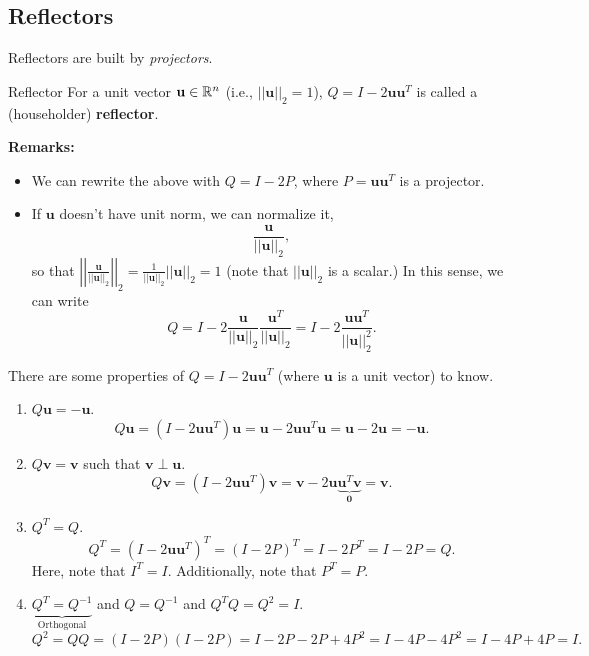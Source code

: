 \documentclass[letterpaper]{article}
\newcommand{\0}{\mathbf{0}}
\newcommand{\vv}{\mathbf{v}}
\renewcommand{\u}{\mathbf{u}}
\begin{document}
\subsection{Reflectors}
Reflectors are built by \emph{projectors}.

\begin{definition}{Reflector}{}
    For a unit vector $\u \in \R^n$ (i.e., $||\u||_2 = 1$), $Q = I - 2\u \u^T$ is called a (householder) \textbf{reflector}. 
\end{definition}
\textbf{Remarks:} 
\begin{itemize}
    \item We can rewrite the above with $Q = I - 2P$, where $P = \u \u^T$ is a projector. 
    \item If $\u$ doesn't have unit norm, we can normalize it,
    \[\frac{\u}{||\u||_2},\]
    so that $\left|\left| \frac{\u}{||\u||_2} \right|\right|_2 = \frac{1}{||\u||_2} ||\u||_2 = 1$ (note that $||\u||_2$ is a scalar.) In this sense, we can write 
    \[Q = I - 2 \frac{\u}{||\u||_2} \frac{\u^T}{||\u||_2} = I - 2 \frac{\u\u^T}{||\u||_2^2}.\]
\end{itemize}
There are some properties of $Q = I - 2 \u\u^T$ (where $\u$ is a unit vector) to know.
\begin{enumerate}
    \item $Q\u = -\u$. 
    \[Q\u = (I - 2\u\u^T)\u = \u - 2\u\u^T\u = \u - 2\u = -\u.\]

    \item $Q\vv = \vv$ such that $\vv \perp \u$.
    \[Q\vv = (I - 2\u\u^T)\vv = \vv - 2\u\underbrace{\u^T\vv}_{\0} = \vv.\]

    \item $Q^T = Q$. 
    \[Q^T = (I - 2\u\u^T)^T = (I - 2P)^T = I - 2P^T = I - 2P = Q.\]
    Here, note that $I^T = I$. Additionally, note that $P^T = P$.

    \item $\underbrace{Q^T = Q^{-1}}_{\text{Orthogonal}}$ and $Q = Q^{-1}$ and $Q^T Q = Q^2 = I$. 
    \[Q^2 = QQ = (I - 2P)(I - 2P) = I - 2P - 2P + 4P^2 = I - 4P - 4P^2 = I - 4P + 4P = I.\]
\end{enumerate}
\end{document}
